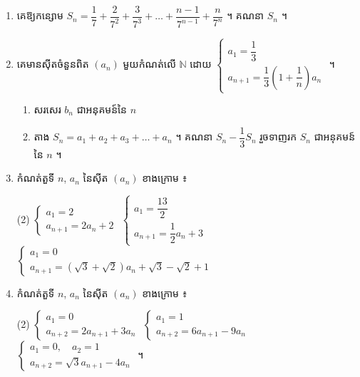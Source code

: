 \begin{enumerate}[1]
\begin{enumerate}[a]
    \item សរសេរ $b_n$ និង $a_n$ ជាអនុគមន៍នៃ $n$ ចំពោះតម្លៃ $k$ ខាងលើ ។
  \end{enumerate}
  \item គេឱ្យកន្សោម $S_n = \dfrac{1}{7} + \dfrac{2}{7^2} + \dfrac{3}{7^3} + \ldots + \dfrac{n - 1}{7^{n-1}} + \dfrac{n}{7^n}$ ។ គណនា $S_n$ ។
  \item គេមានស៊ីតចំនួនពិត $(a_n)$ មួយកំណត់លើ $\mathbb{N}$ ដោយ $\begin{cases} a_1 = \dfrac{1}{3}\\ a_{n+1} = \dfrac{1}{3}\left(1 + \dfrac{1}{n}\right)a_n \end{cases}$ ។
  \begin{enumerate}[a]
    \item សរសេរ $b_n$ ជាអនុគមន៍នៃ $n$
    \item តាង $S_n = a_1 + a_2 + a_3 + \ldots + a_n$ ។ គណនា $S_n - \dfrac{1}{3}S_n$ រួចទាញរក $S_n$ ជាអនុគមន៍នៃ $n$ ។
  \end{enumerate}
  \item កំណត់តួទី $n$, $a_n$ នៃស៊ីត $(a_n)$ ខាងក្រោម ៖
  \begin{tasks}(2)
    \task $\begin{cases} a_1 = 2\\ a_{n+1} = 2a_n + 2 \end{cases}$
    \task $\begin{cases} a_1 = \dfrac{13}{2}\\ a_{n+1} = \dfrac{1}{2}a_n + 3 \end{cases}$
    \task $\begin{cases} a_1 = 0\\ a_{n+1} = (\sqrt{3} + \sqrt{2})a_n + \sqrt{3} - \sqrt{2} + 1 \end{cases}$
  \end{tasks}
  \item កំណត់តួទី $n$, $a_n$ នៃស៊ីត $(a_n)$ ខាងក្រោម ៖
  \begin{tasks}(2)
    \task $\begin{cases} a_1 = 0\\ a_{n+2} = 2a_{n+1} + 3a_n \end{cases}$
    \task $\begin{cases} a_1 = 1\\ a_{n+2} = 6a_{n+1} - 9a_n \end{cases}$
    \task $\begin{cases} a_1 = 0, \quad a_2 = 1\\ a_{n+2} = \sqrt{3}a_{n+1} - 4a_n \end{cases}$ ។
  \end{tasks}
\end{enumerate}

